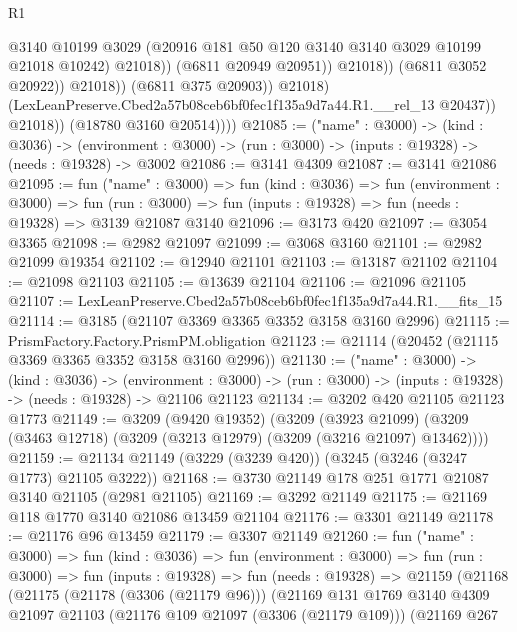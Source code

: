 \begin{lexlean}{R1}
\begin{coremodule}
                                    @3140
                                    @10199
                                    @3029
                                    (@20916 @181 @50 @120 @3140 @3140 @3029 @10199 @21018 @10242)
                                    @21018))
                                (@6811 @20949 @20951))
                              @21018))
                          (@6811 @3052 @20922))
                        @21018))
                    (@6811 @375 @20903))
                  @21018)
                (LexLeanPreserve.Cbed2a57b08ceb6bf0fec1f135a9d7a44.R1.__rel_13 @20437))
              @21018))
          (@18780 @3160 @20514))))
@21085 := ("name" : @3000) ->
  (kind : @3036) ->
  (environment : @3000) -> (run : @3000) -> (inputs : @19328) -> (needs : @19328) -> @3002
@21086 := @3141 @4309
@21087 := @3141 @21086
@21095 := fun ("name" : @3000) =>
  fun (kind : @3036) =>
  fun (environment : @3000) =>
  fun (run : @3000) => fun (inputs : @19328) => fun (needs : @19328) => @3139 @21087 @3140
@21096 := @3173 @420
@21097 := @3054 @3365
@21098 := @2982 @21097
@21099 := @3068 @3160
@21101 := @2982 @21099 @19354
@21102 := @12940 @21101
@21103 := @13187 @21102
@21104 := @21098 @21103
@21105 := @13639 @21104
@21106 := @21096 @21105
@21107 := LexLeanPreserve.Cbed2a57b08ceb6bf0fec1f135a9d7a44.R1.__fits_15
@21114 := @3185 (@21107 @3369 @3365 @3352 @3158 @3160 @2996)
@21115 := PrismFactory.Factory.PrismPM.obligation
@21123 := @21114 (@20452 (@21115 @3369 @3365 @3352 @3158 @3160 @2996))
@21130 := ("name" : @3000) ->
  (kind : @3036) ->
  (environment : @3000) -> (run : @3000) -> (inputs : @19328) -> (needs : @19328) -> @21106 @21123
@21134 := @3202 @420 @21105 @21123 @1773
@21149 := @3209
    (@9420 @19352)
    (@3209
      (@3923 @21099)
      (@3209 (@3463 @12718) (@3209 (@3213 @12979) (@3209 (@3216 @21097) @13462))))
@21159 := @21134 @21149 (@3229 (@3239 @420)) (@3245 (@3246 (@3247 @1773) @21105 @3222))
@21168 := @3730 @21149 @178 @251 @1771 @21087 @3140 @21105 (@2981 @21105)
@21169 := @3292 @21149
@21175 := @21169 @118 @1770 @3140 @21086 @13459 @21104
@21176 := @3301 @21149
@21178 := @21176 @96 @13459
@21179 := @3307 @21149
@21260 := fun ("name" : @3000) =>
  fun (kind : @3036) =>
  fun (environment : @3000) =>
  fun (run : @3000) =>
  fun (inputs : @19328) =>
  fun (needs : @19328) =>
  @21159
    (@21168
      (@21175
        (@21178 (@3306 (@21179 @96)))
        (@21169
          @131
          @1769
          @3140
          @4309
          @21097
          @21103
          (@21176 @109 @21097 (@3306 (@21179 @109)))
          (@21169
            @267

\end{coremodule}
\end{lexlean}
